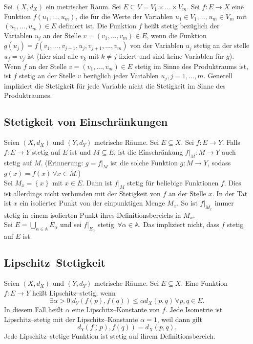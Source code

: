 \documentclass[a4paper,12pt]{article}
\begin{document}
Sei $(X,d_X)$ ein metrischer Raum. Sei $E\subseteq V=V_1\times \hdots \times V_m$. Sei $f:E\rightarrow X$ eine Funktion $f(u_1,\hdots ,u_m)$, die für die Werte der Variablen $u_1 \in V_1,\hdots ,u_m \in V_m$ mit $(u_1,\hdots ,u_m) \in E$ definiert ist. Die Funktion $f$ heißt stetig bezüglich der Variablen $u_j$ an der Stelle $v=(v_1,\hdots ,v_m) \in E$, wenn die Funktion $g(u_j)=f(v_1,\hdots ,v_{j-1},u_j,v_{j+1},\hdots ,v_m)$ von der Variablen $u_j$ stetig an der stelle $u_j=v_j$ ist (hier sind alle $v_k$ mit $k\neq j$ fixiert und sind keine Variablen für $g$). Wenn $f$ an der Stelle $v=(v_1,\hdots ,v_m) \in E$ stetig im Sinne des Produktraums ist, ist $f$ stetig an der Stelle $v$ bezüglich jeder Variablen $u_j,j=1,\hdots ,m$. Generell impliziert die Stetigkeit für jede Variable nicht die Stetigkeit im Sinne des Produktraumes.

\subsection{Stetigkeit von Einschränkungen}
Seien $(X,d_X)$ und $(Y,d_Y)$ metrische Räume. Sei $E\subseteq X$. Sei $f:E\rightarrow Y$. Falls $f:E\rightarrow Y$ stetig auf $E$ ist und $M\subseteq E$, ist die Einschränkung $f|_M:M\rightarrow Y$ auch stetig auf $M$. (Erinnerung: $g=f|_M$ ist die solche Funktion $g:M\rightarrow Y$, sodass $g(x)=f(x)\,\forall x \in M$.)\\\indent
Sei $M_x=\left\{x\right\}$ mit $x \in E$. Dann ist $f|_M$ stetig für beliebige Funktionen $f$. Dies ist allerdings nicht verbunden mit der Stetigkeit von $f$ an der Stelle $x$. In der Tat ist $x$ ein isolierter Punkt von der einpunktigen Menge $M_x$. So ist $f|_{M_x}$ immer stetig in einem isolierten Punkt ihres Definitionsbereichs in $M_x$.\\\indent
Sei $E=\bigcup_{\alpha  \in \mathbb{A}}E_\alpha $ und sei $f|_{E_\alpha }$ stetig $\,\forall \alpha  \in \mathbb{A}$. Das impliziert nicht, dass $f$ stetig auf $E$ ist.

\subsection{Lipschitz--Stetigkeit}
Seien $(X,d_X)$ und $(Y,d_Y)$ metrische Räume. Sei $E\subseteq X$. Eine Funktion $f:E\rightarrow Y$ heißt Lipschitz--stetig, wenn
\[ 
        \exists \alpha >0|d_Y\left(f(p),f(q)\right)\leq \alpha d_X(p,q)\,\forall p,q \in E
.\] 
In diesem Fall heißt $\alpha $ eine Lipschitz--Konstante von $f$. Jede Isometrie ist Lipschitz--stetig mit der Lipschitz--Konstante $\alpha =1$, weil dann gilt
\[ 
        d_Y\left(f(p),f(q)\right)=d_X(p,q)
.\] 
Jede Lipschitz--stetige Funktion ist stetig auf ihrem Definitionsbereich.
\end{document}
